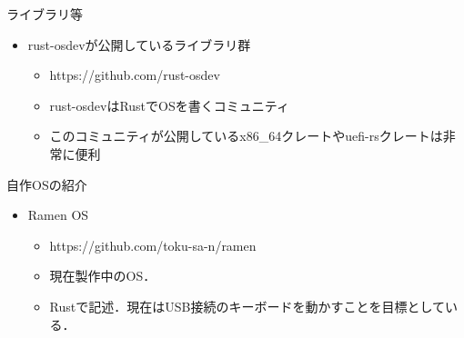 \documentclass[titlepage,dvipdfmx,uplatex,a4j,12pt]{beamer}
\begin{document}
\begin{frame}{ライブラリ等}
    \begin{itemize}
        \item rust-osdevが公開しているライブラリ群
            \begin{itemize}
                \item https://github.com/rust-osdev
                \item rust-osdevはRustでOSを書くコミュニティ
                \item このコミュニティが公開しているx86\_64クレートやuefi-rsクレートは非常に便利
            \end{itemize}
    \end{itemize}
\end{frame}

\begin{frame}{自作OSの紹介}
    \begin{itemize}
        \item Ramen OS
            \begin{itemize}
                \item https://github.com/toku-sa-n/ramen
                \item 現在製作中のOS．
                \item Rustで記述．現在はUSB接続のキーボードを動かすことを目標としている．
            \end{itemize}
    \end{itemize}
\end{frame}
\end{document}
